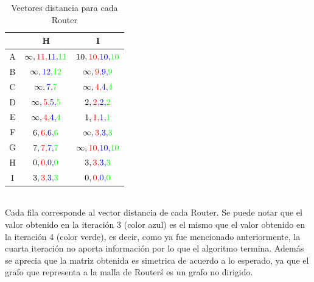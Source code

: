 \documentclass[a4paper,10pt]{article}
\begin{document}
\begin{table}[H]
\centering
\begin{tabular}{|c|c|c|} \hline
   & H & I  \\\hline
A & $ \infty,{\color{red}11,}{\color{blue}11,}{\color{green}11} $ & $10,{\color{red}10,}{\color{blue}10,}{\color{green}10} $ \\\hline
B & $\infty,{\color{blue}12,}{\color{green}12} $ & $\infty,{\color{red}9,}{\color{blue}9,}{\color{green}9} $ \\\hline
C & $\infty,{\color{blue}7,}{\color{green}7} $ & $ \infty,{\color{red}4,}{\color{blue}4,}{\color{green}4}$ \\\hline
D & $\infty,{\color{red}5,}{\color{blue}5,}{\color{green}5} $ & $2,{\color{red}2,}{\color{blue}2,}{\color{green}2} $ \\\hline
E & $\infty,{\color{red}4,}{\color{blue}4,}{\color{green}4} $ & $1,{\color{red}1,}{\color{blue}1,}{\color{green}1} $ \\\hline
F & $6,{\color{red}6,}{\color{blue}6,}{\color{green}6} $ & $\infty,{\color{red}3,}{\color{blue}3,}{\color{green}3} $ \\\hline
G & $7,{\color{red}7,}{\color{blue}7,}{\color{green}7} $ & $\infty,{\color{red}10,}{\color{blue}10,}{\color{green}10}$ \\\hline
H & $0,{\color{red}0,}{\color{blue}0,}{\color{green}0} $ & $3,{\color{red}3,}{\color{blue}3,}{\color{green}3}$ \\\hline
I  & $3,{\color{red}3,}{\color{blue}3,}{\color{green}3} $ & $0,{\color{red}0,}{\color{blue}0,}{\color{green}0} $ \\\hline
\end{tabular}
\caption{Vectores distancia para cada Router}
\end{table} \\






Cada fila corresponde al vector distancia de cada Router. Se puede notar que el valor obtenido en la iteración 3 (color azul) es el mismo que el valor obtenido en la iteración 4 (color verde), es decir, como ya fue mencionado anteriormente, la cuarta iteración no aporta información por lo que el algoritmo termina. Además se aprecia que la matriz obtenida es simetrica de acuerdo a lo esperado, ya que el grafo que representa a la malla de Router\'s es un grafo no dirigido. \\ \\
\end{document}
